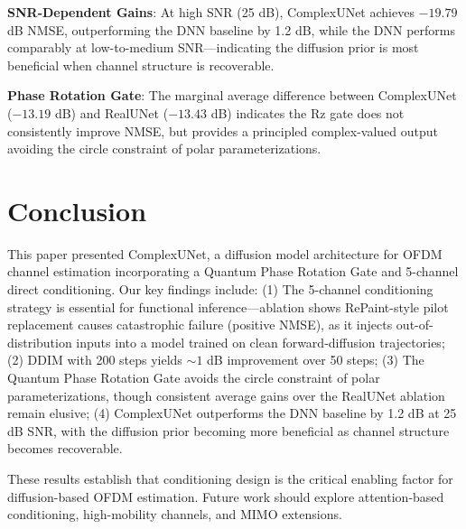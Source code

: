 \documentclass[conference]{IEEEtran}
\begin{document}
\textbf{SNR-Dependent Gains}: At high SNR (25 dB), ComplexUNet achieves $-19.79$ dB NMSE, outperforming the DNN baseline by 1.2 dB, while the DNN performs comparably at low-to-medium SNR—indicating the diffusion prior is most beneficial when channel structure is recoverable.

\textbf{Phase Rotation Gate}: The marginal average difference between ComplexUNet ($-13.19$ dB) and RealUNet ($-13.43$ dB) indicates the Rz gate does not consistently improve NMSE, but provides a principled complex-valued output avoiding the circle constraint of polar parameterizations.

\section{Conclusion}

This paper presented ComplexUNet, a diffusion model architecture for OFDM channel estimation incorporating a Quantum Phase Rotation Gate and 5-channel direct conditioning. Our key findings include: (1) The 5-channel conditioning strategy is essential for functional inference—ablation shows RePaint-style pilot replacement causes catastrophic failure (positive NMSE), as it injects out-of-distribution inputs into a model trained on clean forward-diffusion trajectories; (2) DDIM with 200 steps yields ${\sim}1$ dB improvement over 50 steps; (3) The Quantum Phase Rotation Gate avoids the circle constraint of polar parameterizations, though consistent average gains over the RealUNet ablation remain elusive; (4) ComplexUNet outperforms the DNN baseline by 1.2 dB at 25 dB SNR, with the diffusion prior becoming more beneficial as channel structure becomes recoverable.

These results establish that conditioning design is the critical enabling factor for diffusion-based OFDM estimation. Future work should explore attention-based conditioning, high-mobility channels, and MIMO extensions.

\vspace{-4pt}


\end{document}
